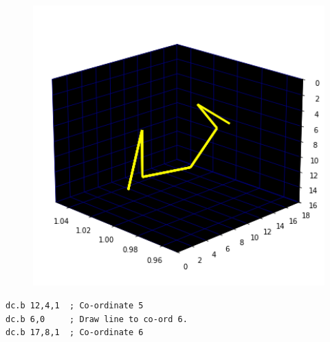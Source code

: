\begin{minipage}[c]{0.48\linewidth}
\begin{figure}[H]
    \centering
    \begin{adjustbox}{width=5.5cm,center}
      \includegraphics[width=12cm]{src/claws/build_claw_5_0.png}%
    \end{adjustbox}
\end{figure}
\end{minipage}
\begin{minipage}[c]{0.48\linewidth}
\begin{lstlisting}[basicstyle=\scriptsize\ttfamily]
dc.b 12,4,1  ; Co-ordinate 5
dc.b 6,0     ; Draw line to co-ord 6.
dc.b 17,8,1  ; Co-ordinate 6
\end{lstlisting}
\vspace*{\fill}
\end{minipage}

